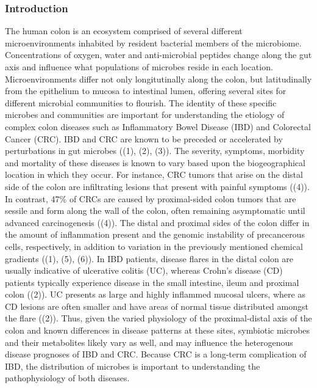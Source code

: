 \documentclass[11pt,]{article}
\begin{document}
\subsubsection{Introduction}\label{introduction}

The human colon is an ecosystem comprised of several different
microenvironments inhabited by resident bacterial members of the
microbiome. Concentrations of oxygen, water and anti-microbial peptides
change along the gut axis and influence what populations of microbes
reside in each location. Microenvironments differ not only
longitutinally along the colon, but latitudinally from the epithelium to
mucosa to intestinal lumen, offering several sites for different
microbial communities to flourish. The identity of these specific
microbes and communities are important for understanding the etiology of
complex colon diseases such as Inflammatory Bowel Disease (IBD) and
Colorectal Cancer (CRC). IBD and CRC are known to be preceded or
accelerated by perturbations in gut microbes ((1), (2), (3)). The
severity, symptoms, morbidity and mortality of these diseases is known
to vary based upon the biogeographical location in which they occur. For
instance, CRC tumors that arise on the distal side of the colon are
infiltrating lesions that present with painful symptoms ((4)). In
contrast, 47\% of CRCs are caused by proximal-sided colon tumors that
are sessile and form along the wall of the colon, often remaining
asymptomatic until advanced carcinogenesis ((4)). The distal and
proximal sides of the colon differ in the amount of inflammation present
and the genomic instability of precancerous cells, respectively, in
addition to variation in the previously mentioned chemical gradients
((1), (5), (6)). In IBD patients, disease flares in the distal colon are
usually indicative of ulcerative colitis (UC), whereas Crohn's disease
(CD) patients typically experience disease in the small intestine, ileum
and proximal colon ((2)). UC presents as large and highly inflammed
mucosal ulcers, where as CD lesions are often smaller and have areas of
normal tissue distributed amongst the flare ((2)). Thus, given the
varied physiology of the proximal-distal axis of the colon and known
differences in disease patterns at these sites, symbiotic microbes and
their metabolites likely vary as well, and may influence the
heterogenous disease prognoses of IBD and CRC. Because CRC is a
long-term complication of IBD, the distribution of microbes is important
to understanding the pathophysiology of both diseases.
\end{document}
